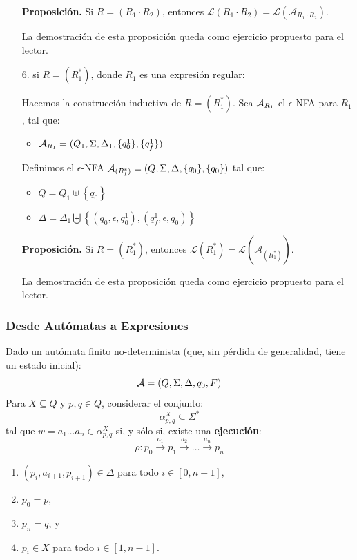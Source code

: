 \begin{enumerate}
        \textbf{Proposición.} Si $R = (R_1 \cdot R_2)$, entonces $\mathcal{L}\left(R_1\cdot R_2\right)=\mathcal{L}\left(\mathcal{A}_{R_1\cdot R_2}\right)$. \medbreak

        La demostración de esta proposición queda como ejercicio propuesto para el lector.

    \item[6.] si $R = (R_1^*)$, donde $R_1$ es una expresión regular:

        Hacemos la construcción inductiva de $R = (R_1^*)$. Sea $\mathcal{A}_{R_1}$ el $\epsilon$-NFA para $R_1$, tal que:
        \begin{itemize}
            \item $\mathcal{A}_{R_1} = (Q_1, \Sigma, \Delta_1, \{q_0^1\}, \{q_f^1\})$
        \end{itemize}

        Definimos el $\epsilon$-NFA $\mathcal{A}_{(R_1^*)} = (Q, \Sigma, \Delta, \{q_0\}, \{q_0\})$ tal que:
        \begin{itemize}
            \item $Q=Q_1 \uplus\left\{q_0\right\}$
            \item $\Delta=\Delta_1 \biguplus\left\{\left(q_0, \epsilon, q_0^1\right),\left(q_f^1, \epsilon, q_0\right)\right\}$
        \end{itemize}

        \textbf{Proposición.} Si $R = (R_1^*)$, entonces $\mathcal{L}\left(R_1^*\right)=\mathcal{L}\left(\mathcal{A}_{(R_1^*)}\right)$. \medbreak

        La demostración de esta proposición queda como ejercicio propuesto para el lector.
\end{enumerate}


\subsubsection{Desde Autómatas a Expresiones}

Dado un autómata finito no-determinista (que, sin pérdida de generalidad, tiene un estado inicial):
$$
    \mathcal{A} = (Q, \Sigma, \Delta, q_0, F)
$$
Para $X \subseteq Q$ y $p,q \in Q$, considerar el conjunto:
$$
    \alpha_{p,q}^X \subseteq \Sigma^*
$$
tal que $w = a_1 \ldots a_n \in \alpha_{p,q}^X$ si, y sólo si, existe una \textbf{ejecución}:
$$
    \rho: p_0 \stackrel{a_1}{\rightarrow} p_1 \stackrel{a_2}{\rightarrow} \ldots \stackrel{a_n}{\rightarrow} p_n
$$
\begin{enumerate}
    \item $\left(p_i, a_{i+1}, p_{i+1}\right) \in \Delta$ para todo $i \in [0,n-1]$,
    \item $p_0 = p$,
    \item $p_n = q$, y
    \item $p_i \in X$ para todo $i \in [1,n-1]$.
\end{enumerate}

